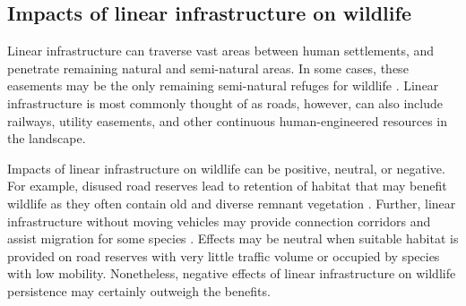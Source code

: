 %

\subsection{Impacts of linear infrastructure on wildlife}

Linear infrastructure can traverse vast areas between human settlements, and penetrate remaining natural and semi-natural areas. In some cases, these easements may be the only remaining semi-natural refuges for wildlife \citep{benn91}. Linear infrastructure is most commonly thought of as roads, however, can also include railways, utility easements, and other continuous human-engineered resources in the landscape.

Impacts of linear infrastructure on wildlife can be positive, neutral, or negative. For example, disused road reserves lead to retention of habitat that may benefit wildlife as they often contain old and diverse remnant vegetation \citep{lent11}. Further, linear infrastructure without moving vehicles may provide connection corridors and assist migration for some species \citep{rvdr15}. Effects may be neutral when suitable habitat is provided on road reserves with very little traffic volume or occupied by species with low mobility. Nonetheless, negative effects of linear infrastructure on wildlife persistence may certainly outweigh the benefits.

